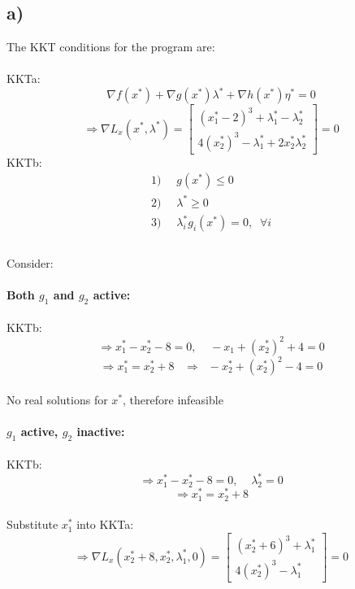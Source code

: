 \documentclass{article}
\begin{document}
\subsection*{a)}\label{ssec:name}
The KKT conditions for the program are:\\
\\
\hspace*{10mm}
KKTa: 
$$\nabla f(x^*)+\nabla g(x^*)\lambda^* + \nabla h(x^*)\eta^*=0$$
$$\Rightarrow \nabla L_x(x^*,\lambda^*) = 
\begin{bmatrix}
(x_1^*-2)^3+\lambda_1^*-\lambda_2^*\\
4(x_2^*)^3-\lambda_1^*+2x_2^*\lambda_2^*
\end{bmatrix}
=0
$$
\hspace*{10mm}
KKTb:
\begin{align*}
1)&\;\;g(x^*)\leq0\\
2)&\;\;\lambda^*\geq0\\
3)&\;\;\lambda_i^*g_i(x^*)=0,\;\;\forall i\\
\end{align*}
\\
Consider:\\
\\
\hspace*{10mm}
\textbf{Both $g_1$ and $g_2$ active:}\\
\\
\hspace*{20mm}
KKTb:
$$\Rightarrow x_1^*-x_2^*-8 = 0,\;\;\;\;-x_1+(x_2^*)^2+4=0$$
$$\Rightarrow x_1^*=x_2^*+8\;\;\;\Rightarrow\;\; -x_2^*+(x_2^*)^2-4=0$$
\\
\hspace*{20mm}
No real solutions for $x^*$, therefore infeasible\\
\\
\hspace*{10mm}
\textbf{$g_1$ active, $g_2$ inactive:}\\
\\
\hspace*{20mm}
KKTb:
$$\Rightarrow x_1^*-x_2^*-8 = 0,\;\;\;\;\lambda_2^*=0$$
$$\Rightarrow  x_1^* = x_2^*+8$$
\\
\hspace*{20mm}
Substitute $x_1^*$ into KKTa:
$$\Rightarrow \nabla L_x(x_2^*+8,x_2^*,\lambda_1^*,0) = 
\begin{bmatrix}
(x_2^*+6)^3+\lambda_1^*\\
4(x_2^*)^3-\lambda_1^*
\end{bmatrix}
=0
$$
\end{document}
